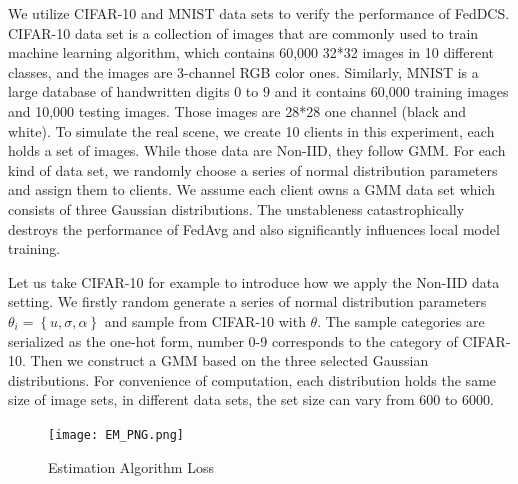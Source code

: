 \documentclass[conference]{IEEEtran}
\begin{document}
We utilize CIFAR-10 and MNIST data sets to 
verify the performance of FedDCS. CIFAR-10 data set is a collection of
 images that are commonly used to train machine learning algorithm, 
 which contains 60,000 32*32 images in 10 different classes, 
 and the images are 3-channel RGB color ones. Similarly, 
 MNIST is a large database of handwritten digits $0$ to $9$ 
 and it contains 60,000 training images and 10,000 testing images.
Those images are 28*28 one channel (black and white). 
To simulate the real scene, we 
create 10 clients in this experiment, each holds a set of images. 
While those data are Non-IID, they follow GMM. For each kind of data set,
we randomly choose a series of normal distribution parameters and assign 
them to clients. We assume each client owns a GMM data set which 
consists of three Gaussian distributions. 
The unstableness catastrophically destroys the performance of FedAvg 
and also significantly influences local model training.

    Let us take CIFAR-10 for example to introduce how we apply the Non-IID data setting.
We firstly random generate a series of normal distribution parameters
$\theta_i = \left\{ u,\sigma ,\alpha \right\}$ and sample from CIFAR-10 with $\theta$. 
The sample categories are serialized as the one-hot form, 
number 0-9 corresponds to the category of CIFAR-10. 
Then we construct a GMM based on the three selected Gaussian distributions.
For convenience of computation, each distribution holds the same size of image sets, 
in different data sets, the set size can vary from 600 to 6000.
\begin{figure}
    \centering
    \texttt{[image: EM\_PNG.png]}
    \caption{Estimation Algorithm Loss}
    \label{em}
\end{figure}
\end{document}
